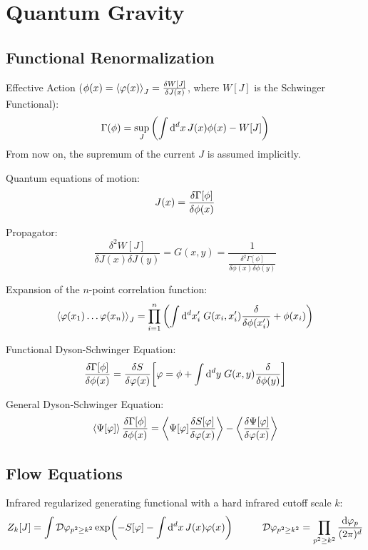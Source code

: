 \section{Quantum Gravity}
	\subsection{Functional Renormalization}
		Effective Action ($\phi(x) = \Avg{\varphi(x)}_J = \fdv{W\qty[J]}{J(x)}$, where $W[J]$ is the Schwinger Functional):
		\begin{equation}
			\Gamma(\phi) = \sup_{J} \qty( \int \dd^d x \, J(x) \phi(x) - W[J])
		\end{equation}
		From now on, the supremum of the current $J$ is assumed implicitly.

		\noindent
		Quantum equations of motion:
		\begin{equation}
			J(x)=\fdv{\Gamma\qty[\phi]}{\phi(x)}
		\end{equation}

		\noindent
		Propagator:
		\begin{equation}
			\frac{\delta^2 W[J]}{\delta J(x) \delta J(y)} = G(x,y) = \frac{1}{\frac{\delta^2\Gamma[\phi]}{\delta \phi(x) \delta \phi(y)}}
		\end{equation}

		\noindent
		Expansion of the $n$-point correlation function:
		\begin{equation}
			\Avg{\varphi(x_1) \hdots\varphi(x_n)}_J = \prod_{i=1}^{n} \qty(\int \dd^d x'_i \;G(x_i,x'_i) \fdv{\phi(x'_i)} + \phi(x_i))
		\end{equation}

		\noindent
		Functional Dyson-Schwinger Equation:
		\begin{equation}
			\fdv{\Gamma[\phi]}{\phi(x)} = \fdv{S}{\varphi(x)}\qty[\varphi = \phi + \int \dd^d y\; G(x,y) \fdv{}{\phi(y)}]
		\end{equation}

		\noindent
		General Dyson-Schwinger Equation:
		\begin{equation}
			\Avg{\Psi[\varphi]} \fdv{\Gamma[\phi]}{\phi(x)} = \Avg{\Psi[\varphi] \fdv{S[\varphi]}{\varphi(x)}} - \Avg{\fdv{\Psi[\varphi]}{\varphi(x)}}
		\end{equation}

	\subsection{Flow Equations}
		Infrared regularized generating functional with a hard infrared cutoff scale $k$:
		\begin{equation}
			Z_k[J] = \int \mathcal{D}\varphi_{p^2 \ge k^2} \exp(-S[\varphi] - \int \dd^d x \, J(x) \varphi(x))
			\hspace{30pt} \mathcal{D}\varphi_{p^2 \ge k^2} = \prod_{p^2 \ge k^2} \frac{\dd \varphi_p}{(2\pi)^d}
		\end{equation}

